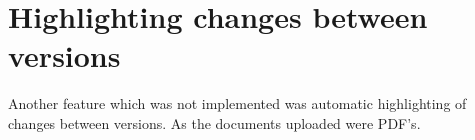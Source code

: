 \documentclass[../../master.tex]{subfiles}
\begin{document}
\section{Highlighting changes between versions}
Another feature which was not implemented was automatic highlighting of changes between versions. As the documents uploaded were PDF's.
\end{document}
